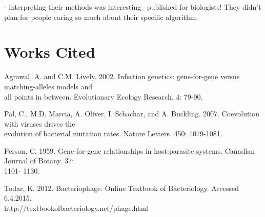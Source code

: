 \documentclass[11pt, oneside]{article}
\begin{document}
- interpreting their methods was interesting-- published for biologists! They didn't plan for people caring so much about their specific algorithm. 

\section{Works Cited}
Agrawal, A. and C.M. Lively. 2002. Infection genetics: gene-for-gene versus matching-alleles models and \\\-\hspace{0.75cm} all points in between. Evolutionary Ecology Research. 4: 79-90.

Pal, C., M.D. Marcia, A. Oliver, I. Schachar, and A. Buckling. 2007. Coevolution with viruses drives the \\\-\hspace{0.75cm} evolution of bacterial mutation rates. Nature Letters. 450: 1079-1081.

Person, C. 1959. Gene-for-gene relationships in host:parasite systems. Canadian Journal of Botany. 37: \\\-\hspace{0.75cm} 1101- 1130.

Todar, K. 2012. Bacteriophage. Online Textbook of Bacteriology. Accessed 6.4.2015.\\\-\hspace{0.75cm} http://textbookofbacteriology.net/phage.html
\end{document}
